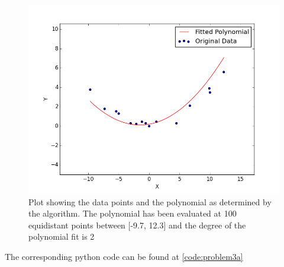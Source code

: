 \documentclass[a4paper,11pt]{article}
\begin{document}
\begin{figure}[ht]
	\center
    \includegraphics[scale=0.75]{Q1_fig.png}
    \caption{Plot showing the data points and the polynomial as determined by the algorithm. The polynomial has been evaluated at 100 equidistant points between [-9.7, 12.3] and the degree of the polynomial fit is 2}
	\label{fig:Q1_fig}
\end{figure}



The corresponding python code can be found at \ref{code:problem3a}
\end{document}
